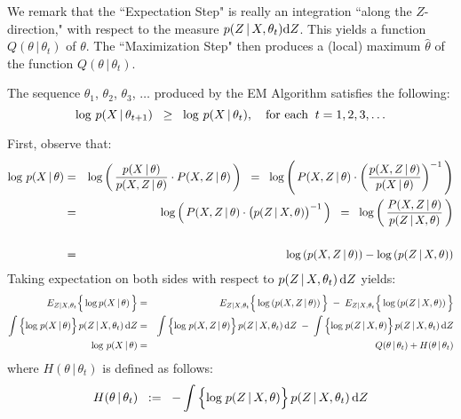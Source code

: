 \begin{remark}\quad
We remark that the ``Expectation Step" is really an integration ``along the $Z$-direction,"
with respect to the measure $p(Z\,|\,X,\theta_{t})\textnormal{d}Z$.
This yields a function $Q(\theta\,|\,\theta_{t})$ of $\theta$.
The ``Maximization Step" then produces a (local) maximum $\widehat{\theta}$ of the function
$Q(\theta\,|\,\theta_{t})$.
\end{remark}
\begin{theorem}\quad
The sequence $\theta_{1}$, $\theta_{2}$, $\theta_{3}$, $\ldots$ produced by the EM Algorithm
satisfies the following:
\begin{equation*}
\log\,p(X\,|\,\theta_{t+1}) \;\; \geq \;\; \log\,p(X\,|\,\theta_{t}),
\quad
\textnormal{for each}\;\;t = 1, 2, 3, \ldots
\end{equation*}
\end{theorem}
\proof First, observe that:
\begin{eqnarray*}
\log\,p(X\,|\,\theta)
& = &
	\log\left(\,\dfrac{p(X\,\vert\,\theta)}{p(X,Z\,\vert\,\theta)} \cdot P(X,Z\,\vert\,\theta)\,\right)
\;\;=\;\;
	\log\left(\,P(X,Z\,\vert\,\theta) \cdot \left(\dfrac{p(X,Z\,\vert\,\theta)}{p(X\,\vert\,\theta)}\right)^{-1} \,\right)
\\
&=&
	\log\left(\,P(X,Z\,\vert\,\theta) \cdot \left(\overset{{\color{white}.}}{p}(Z\,\vert\,X,\theta)\right)^{-1} \,\right)
\;\;=\;\;
	\log\left(\,\dfrac{P(X,Z\,\vert\,\theta)}{p(Z\,\vert\,X,\theta)}\,\right)
\\
&&
\\
& = &
	\log\left(p(X,Z\,|\,\theta)\right) - \log\left(p(Z\,|\,X,\theta)\right)
\end{eqnarray*}
Taking expectation on both sides with respect to $p(Z\,|\,X,\theta_{t})\,\textnormal{d}Z$ yields:
\begin{eqnarray*}
E_{Z|X,\theta_{t}}\!\left\{\,\overset{{\color{white}.}}{\log}\,p(X\,|\,\theta)\,\right\}
& = &
E_{Z|X,\theta_{t}}\!\left\{\,\overset{{\color{white}.}}{\log}\left(p(X,Z\,|\,\theta)\right)\,\right\}
\;-\;
E_{Z|X,\theta_{t}}\!\left\{\,\overset{{\color{white}.}}{\log}\left(p(Z\,|\,X,\theta)\right)\,\right\}
\\
\int\left\{\overset{{\color{white}.}}{\log}\;p(X\,|\,\theta)\right\}p(Z\,|\,X,\theta_{t})\,\textnormal{d}Z
& = &
\int\left\{\overset{{\color{white}.}}{\log}\;p(X,Z\,|\,\theta)\right\}p(Z\,|\,X,\theta_{t})\,\textnormal{d}Z
\;-\;
\int\left\{\overset{{\color{white}.}}{\log}\;p(Z\,|\,X,\theta)\right\}p(Z\,|\,X,\theta_{t})\,\textnormal{d}Z
\\
\log\,p(X\,|\,\theta)
& = &
Q(\theta\,|\,\theta_{t}) + H(\theta\,|\,\theta_{t})
\end{eqnarray*}
where $H(\theta\,|\,\theta_{t})$ is defined as follows:
\begin{equation*}
H(\theta\,|\,\theta_{t})
\;\; := \;\;
- \int\left\{\overset{{\color{white}.}}{\log}\;p(Z\,|\,X,\theta)\right\}p(Z\,|\,X,\theta_{t})\,\textnormal{d}Z
\end{equation*}

